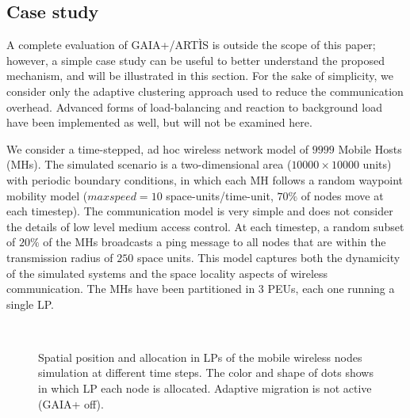 \documentclass[1p]{elsarticle}
\begin{document}
\subsection{Case study}

A complete evaluation of GAIA+/ART\`IS is outside the scope of this
paper; however, a simple case study can be useful to better understand
the proposed mechanism, and will be illustrated in this section. For
the sake of simplicity, we consider only the adaptive clustering
approach used to reduce the communication overhead. Advanced forms of
load-balancing and reaction to background load have been implemented
as well, but will not be examined here.

We consider a time-stepped, ad hoc wireless network model of $9999$
Mobile Hosts (MHs). The simulated scenario is a two-dimensional area
($10000 \times 10000$ units) with periodic boundary conditions, in
which each MH follows a random waypoint mobility model ($\mathit{max
  speed}=10$ space-units/time-unit, $70\%$ of nodes move at each
timestep). The communication model is very simple and does not
consider the details of low level medium access control. At each
timestep, a random subset of $20\%$ of the MHs broadcasts a ping
message to all nodes that are within the transmission radius of $250$
space units. This model captures both the dynamicity of the simulated
systems and the space locality aspects of wireless communication. The
MHs have been partitioned in $3$ PEUs, each one running a single LP.

\begin{figure}[!t]
\centering
{}
\\
\caption{Spatial position and allocation in LPs of the mobile wireless
  nodes simulation at different time steps. The color and shape of
  dots shows in which LP each node is allocated. Adaptive migration is
  not active (GAIA+ off).}
\label{fig_nogaia}
\end{figure}
\end{document}
